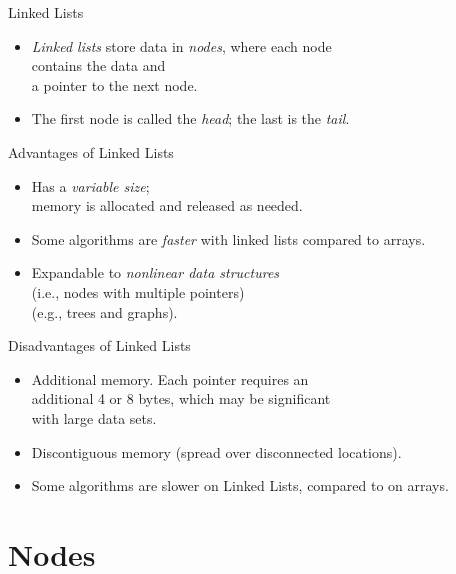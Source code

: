 \documentclass[14pt,aspectratio=1610, hyperref={pdfpagelayout=SinglePage}]{beamer}
\begin{document}
\begin{frame}{Linked Lists}
\begin{itemize}
\item
  \emph{Linked lists} store data in \emph{nodes}, where each node \\contains
  the data and\\ a pointer to the next node.
\item
  The first node is called the \emph{head}; the last is the \emph{tail}.
\end{itemize}
\center%
\end{frame}

\begin{frame}{Advantages of Linked Lists}
\begin{itemize}
\item
  Has a \emph{variable size};\\
  memory is allocated and released as needed.
\item
  Some algorithms are \emph{faster} with linked lists compared to arrays.
\item
  Expandable to \emph{nonlinear data structures}\\
  (i.e., nodes with multiple pointers)\\
  (e.g., trees and graphs).
\end{itemize}
\end{frame}

\begin{frame}{Disadvantages of Linked Lists}
\begin{itemize}
\item
  Additional memory. Each pointer requires an \\additional 4 or 8 bytes, which may be significant \\with large data sets.
\item
  Discontiguous memory (spread over disconnected locations).
\item
  Some algorithms are slower on Linked Lists, compared to on arrays.
\end{itemize}
\end{frame}

\section{Nodes}
\end{document}

